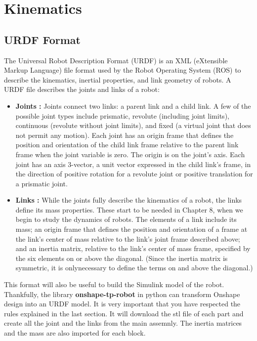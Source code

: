 \section{Kinematics}\insertloftspace
\setcounter{figure}{0}\setcounter{table}{0}

\subsection{URDF Format}

The Universal Robot Description Format (URDF) is an XML (eXtensible Markup Language) file format used by the Robot Operating System (ROS) to describe the kinematics, inertial properties, and link geometry of robots. A URDF file describes the joints and links of a robot:

\begin{itemize}
    \item \textbf{Joints :} Joints connect two links: a parent link and a child link. A few of the possible joint types include prismatic, revolute (including joint limits), continuous (revolute without joint limits), and fixed (a virtual joint that does not permit any motion). Each joint has an origin frame that defines the position and orientation of the child link frame relative to the parent link frame when the joint variable is zero. The origin is on the joint's axis. Each joint has an axis 3-vector, a unit vector expressed in the child link's frame, in the direction of positive rotation for a revolute joint or positive translation for a prismatic joint.
    \item \textbf{Links :} While the joints fully describe the kinematics of a robot, the links define its mass properties. These start to be needed in Chapter 8, when we begin to study the dynamics of robots. The elements of a link include its mass; an origin frame that defines the position and orientation of a frame at the link's center of mass relative to the link's joint frame described above; and an inertia matrix, relative to the link's center of mass frame, specified by the six elements on or above the diagonal. (Since the inertia matrix is symmetric, it is onlynecessary to define the terms on and above the diagonal.)
\end{itemize}

\bigbreak
This format will also be useful to build the Simulink model of the robot. Thankfully, the library \textbf{onshape-tp-robot} in python can transform Onshape design into an URDF model. It is very important that you have respected the rules explained in the last section. It will download the stl file of each part and create all the joint and the links from the main assemnly. The inertia matrices and the mass are also imported for each block. 

